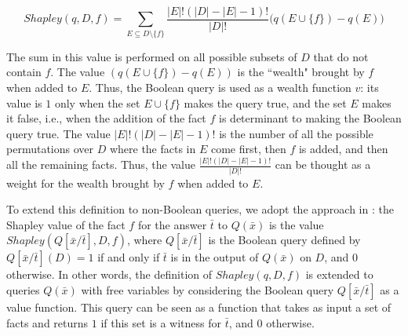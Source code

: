 \documentclass[preprint,12pt,sort&compress]{elsarticle}
\begin{document}
\[
Shapley(q,D,f)= 
\sum_{E\subseteq D \setminus \{f\}} \frac{|E|!(|D|-|E|-1)!}{|D|!} \bigg(
q(E\cup \{f\}) - q(E)\bigg)
\]

\noindent
The sum in this value is performed on all possible subsets of $D$ that do not contain $f$. The value $\left(q(E \cup \{ f\} ) - q(E)\right)$ is the ``wealth" brought by $f$ when added to $E$. 
Thus, the Boolean query is used as a wealth function $v$: its value is $1$ only when the set $E \cup \{ f\}$ makes the query true, and the set $E$ makes it false, i.e., when the addition of the fact $f$ is determinant to making the Boolean query true. 
The value $|E|!(|D| - |E| - 1)!$ is the number of all the possible permutations over $D$ where the facts in $E$ come first, then $f$ is added, and then all the remaining facts. Thus, the value $\frac{|E|!(|D| - |E| - 1)!}{|D|!}$ can be thought as a weight for the wealth brought by $f$ when added to $E$. 

To extend this definition to non-Boolean queries, we adopt the approach in \citet{DFKM22}: the Shapley value of the fact $f$ for the answer $\bar{t}$ to $Q(\bar{x})$ is the value $Shapley(Q[\bar{x} / \bar{t}], D, f)$, where $Q[\bar{x} / \bar{t}]$ is the Boolean query defined by $Q[\bar{x} / \bar{t}](D) = 1$ if and only if $\bar{t}$ is in the output of $Q(\bar{x})$ on $D$, and $0$ otherwise.
In other words, the definition of $Shapley(q, D, f)$ is extended to queries $Q(\bar{x})$ with free variables by considering the Boolean query $Q[\bar{x} / \bar{t}]$ as a value function. This query can be seen as a function that takes as input a set of facts and returns $1$ if this set is a witness for $\bar{t}$, and $0$ otherwise.
\end{document}
